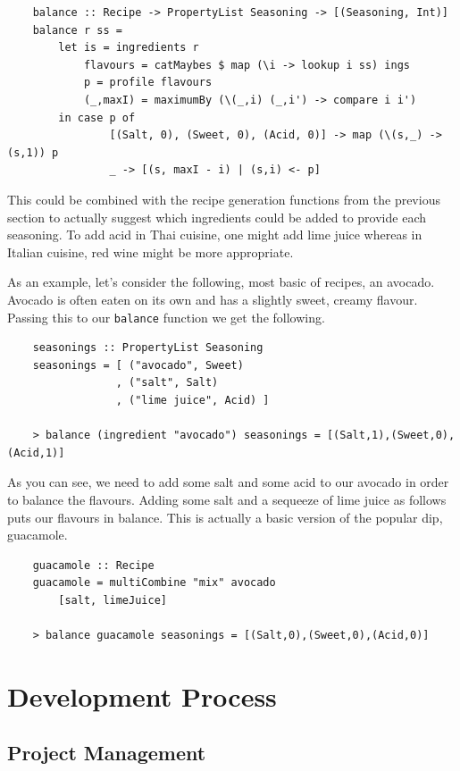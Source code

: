 \documentclass[11pt]{article}
\begin{document}
\begin{lstlisting}
    balance :: Recipe -> PropertyList Seasoning -> [(Seasoning, Int)]
    balance r ss =
        let is = ingredients r
            flavours = catMaybes $ map (\i -> lookup i ss) ings
            p = profile flavours
            (_,maxI) = maximumBy (\(_,i) (_,i') -> compare i i')
        in case p of
                [(Salt, 0), (Sweet, 0), (Acid, 0)] -> map (\(s,_) -> (s,1)) p
                _ -> [(s, maxI - i) | (s,i) <- p]
\end{lstlisting}

This could be combined with the recipe generation functions from the previous
section to actually suggest which ingredients could be added to provide
each seasoning. To add acid in Thai cuisine, one might add lime juice whereas
in Italian cuisine, red wine might be more appropriate.

\medbreak

As an example, let's consider the following, most basic of recipes, an avocado.
Avocado is often eaten on its own and has a slightly sweet, creamy flavour.
Passing this to our \texttt{balance} function we get the following.

\begin{lstlisting}
    seasonings :: PropertyList Seasoning
    seasonings = [ ("avocado", Sweet)
                 , ("salt", Salt)
                 , ("lime juice", Acid) ]

    > balance (ingredient "avocado") seasonings = [(Salt,1),(Sweet,0),(Acid,1)]
\end{lstlisting}

As you can see, we need to add some salt and some acid to our avocado in order
to balance the flavours. Adding some salt and a sequeeze of lime juice
as follows puts our flavours in balance. This is actually a basic version
of the popular dip, guacamole.

\begin{lstlisting}
    guacamole :: Recipe
    guacamole = multiCombine "mix" avocado
        [salt, limeJuice]

    > balance guacamole seasonings = [(Salt,0),(Sweet,0),(Acid,0)]
\end{lstlisting}

\section{Development Process}

\subsection{Project Management}
\end{document}
